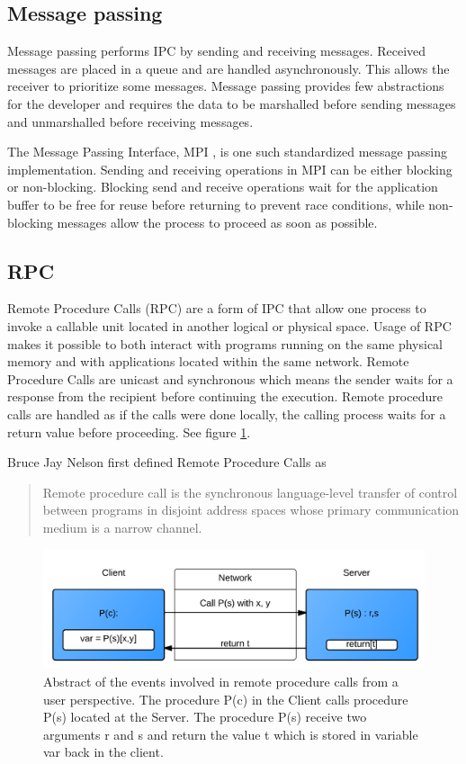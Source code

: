 \subsection{Message passing}
Message passing performs IPC by sending and receiving messages. Received messages are placed in a queue and are handled asynchronously. This allows the receiver to prioritize some messages. Message passing provides few abstractions for the developer and requires the data to be marshalled before sending messages and unmarshalled before receiving messages.

The Message Passing Interface, MPI \cite{mpi3stand}, is one such standardized message passing implementation. Sending and receiving operations in MPI can be either blocking or non-blocking. Blocking send and receive operations wait for the application buffer to be free for reuse before returning to prevent race conditions, while non-blocking messages allow the process to proceed as soon as possible.

\subsection{RPC}
Remote Procedure Calls (RPC) are a form of IPC that allow one process to invoke a callable unit \cite{Eac} located in another logical or physical space. Usage of RPC makes it possible to both interact with programs running on the same physical memory and with applications located within the same network.
Remote Procedure Calls are unicast and synchronous which means the sender waits for a response from the recipient before continuing the execution. Remote procedure calls are handled as if the calls were done locally, the calling process waits for a return value before proceeding. See figure \ref{rpc}.

Bruce Jay Nelson first defined Remote Procedure Calls as
\begin{quotation}
Remote procedure call is the synchronous language-level transfer of control between programs in disjoint address spaces whose primary communication medium is a narrow channel.  \cite{Nelson:1981:RPC:910306}
\end{quotation}

\begin{figure}[H]
	\centering
    	\includegraphics[scale=0.25]{part_2/remote_procedure_calls/rpc.png}
		\caption{Abstract of the events involved in remote procedure calls from a user perspective.
The procedure P(c) in the Client calls procedure P(s) located at the Server. The procedure P(s) receive two arguments r and s and return the value t which is stored in variable var back in the client.}
		\label{rpc} 
\end{figure}


